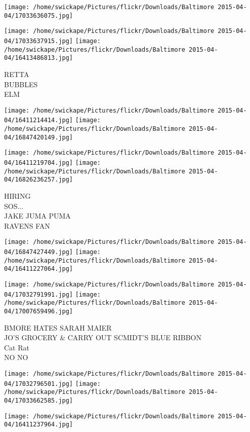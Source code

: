 \documentclass[10pt,letterpaper]{article}
\begin{document}
\texttt{[image: /home/swickape/Pictures/flickr/Downloads/Baltimore 2015-04-04/17033636075.jpg]}

\vspace{0.25in}
\texttt{[image: /home/swickape/Pictures/flickr/Downloads/Baltimore 2015-04-04/17033637915.jpg]}
\texttt{[image: /home/swickape/Pictures/flickr/Downloads/Baltimore 2015-04-04/16413486813.jpg]}

RETTA\\
BUBBLES\\
ELM
\pagebreak

\texttt{[image: /home/swickape/Pictures/flickr/Downloads/Baltimore 2015-04-04/16411214414.jpg]}
\texttt{[image: /home/swickape/Pictures/flickr/Downloads/Baltimore 2015-04-04/16847420149.jpg]}

\texttt{[image: /home/swickape/Pictures/flickr/Downloads/Baltimore 2015-04-04/16411219704.jpg]}
\texttt{[image: /home/swickape/Pictures/flickr/Downloads/Baltimore 2015-04-04/16826236257.jpg]}

HIRING\\
SOS...\\
JAKE JUMA PUMA\\
RAVENS FAN
\pagebreak

\texttt{[image: /home/swickape/Pictures/flickr/Downloads/Baltimore 2015-04-04/16847427449.jpg]}
\texttt{[image: /home/swickape/Pictures/flickr/Downloads/Baltimore 2015-04-04/16411227064.jpg]}

\texttt{[image: /home/swickape/Pictures/flickr/Downloads/Baltimore 2015-04-04/17032791991.jpg]}
\texttt{[image: /home/swickape/Pictures/flickr/Downloads/Baltimore 2015-04-04/17007659496.jpg]}

BMORE HATES SARAH MAIER\\
JO'S GROCERY \& CARRY OUT SCMIDT'S BLUE RIBBON\\
Cat Rat\\
NO NO
\pagebreak

\texttt{[image: /home/swickape/Pictures/flickr/Downloads/Baltimore 2015-04-04/17032796501.jpg]}
\texttt{[image: /home/swickape/Pictures/flickr/Downloads/Baltimore 2015-04-04/17033662585.jpg]}

\vspace{0.25in}
\texttt{[image: /home/swickape/Pictures/flickr/Downloads/Baltimore 2015-04-04/16411237964.jpg]}
\end{document}
